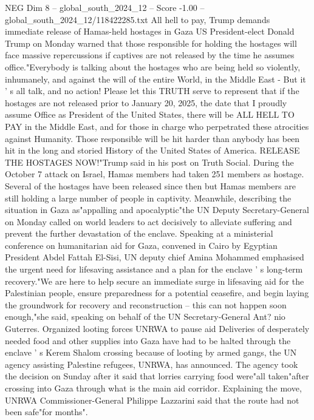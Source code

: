 \begin{textsample}{NEG Dim 8 – global\_south\_2024\_12 – Score -1.00 – global\_south\_2024\_12/118422285.txt}  \label{ex:f8_neg_109}
All hell to pay, Trump demands immediate release of Hamas-held hostages in Gaza US President-elect Donald Trump on Monday warned that those responsible for holding the hostages will face massive repercussions if captives are not released by the time he assumes office."Everybody is talking about the hostages who are being held so violently, inhumanely, and against the will of the entire World, in the Middle East - But it ' s all talk, and no action!
Please let this TRUTH serve to represent that if the hostages are not released prior to January 20, 2025, the date that I proudly assume Office as President of the United States, there will be ALL HELL TO PAY in the Middle East, and for those in charge who perpetrated these atrocities against Humanity.
Those responsible will be hit harder than anybody has been hit in the long and storied History of the United States of America.
RELEASE THE HOSTAGES NOW!"Trump said in his post on Truth Social.
During the October 7 attack on Israel, Hamas members had taken 251 members as hostage.
Several of the hostages have been released since then but Hamas members are still holding a large number of people in captivity.
Meanwhile, describing the situation in Gaza as"appalling and apocalyptic"the UN Deputy Secretary-General on Monday called on world leaders to act decisively to alleviate suffering and prevent the further devastation of the enclave.
Speaking at a ministerial conference on humanitarian aid for Gaza, convened in Cairo by Egyptian President Abdel Fattah El-Sisi, UN deputy chief Amina Mohammed emphasised the urgent need for lifesaving assistance and a plan for the enclave ' s long-term recovery."We are here to help secure an immediate surge in lifesaving aid for the Palestinian people, ensure preparedness for a potential ceasefire, and begin laying the groundwork for recovery and reconstruction -- this can not happen soon enough,"she said, speaking on behalf of the UN Secretary-General Ant? nio Guterres.
Organized looting forces UNRWA to pause aid Deliveries of desperately needed food and other supplies into Gaza have had to be halted through the enclave ' s Kerem Shalom crossing because of looting by armed gangs, the UN agency assisting Palestine refugees, UNRWA, has announced.
The agency took the decision on Sunday after it said that lorries carrying food were"all taken"after crossing into Gaza through what is the main aid corridor.
Explaining the move, UNRWA Commissioner-General Philippe Lazzarini said that the route had not been safe"for months".

\end{textsample}
